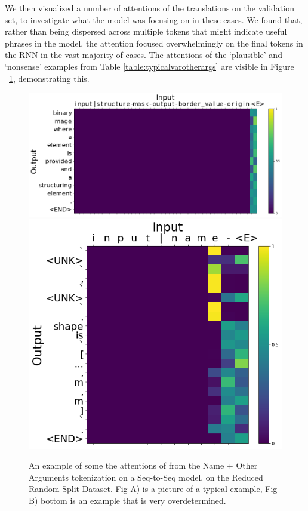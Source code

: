 We then visualized a number of attentions of the translations on the validation set, to investigate what the model was focusing on in these cases.
We found that, rather than being dispersed across multiple tokens that might indicate useful phrases in the model, the attention focused overwhelmingly on the final tokens in the RNN in the vast majority of cases.
The attentions of the `plausible' and `nonsense' examples from  Table \ref{table:typicalvarotherargs} are visible in Figure ~\ref{fig:otherarg_attn}, demonstrating this.

\begin{figure}[ht!]
\begin{center}
    \includegraphics[width=0.9\linewidth]{ImagesCodeRelated/attn1pretty.png}
    \includegraphics[width=0.5\linewidth]{ImagesCodeRelated/attn2pretty.png}
    \caption{An example of some the attentions of from the Name + Other Arguments tokenization on a Seq-to-Seq model, on the Reduced Random-Split Dataset. Fig A) is a picture of a typical example, Fig B) bottom is an example that is very overdetermined.}
    \label{fig:otherarg_attn}
\end{center}
\end{figure}

